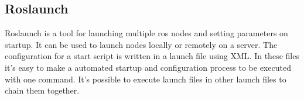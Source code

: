 \subsection{Roslaunch}\label{roslaunch}
Roslaunch is a tool for launching multiple \gls{ros} nodes and setting parameters on startup. It can be used to launch nodes locally or remotely on a server.
The configuration for a start script is written in a launch file using XML. In these files it's easy to make a automated startup and configuration process to be executed with one command. It's possible to execute launch files in other launch files to chain them together.